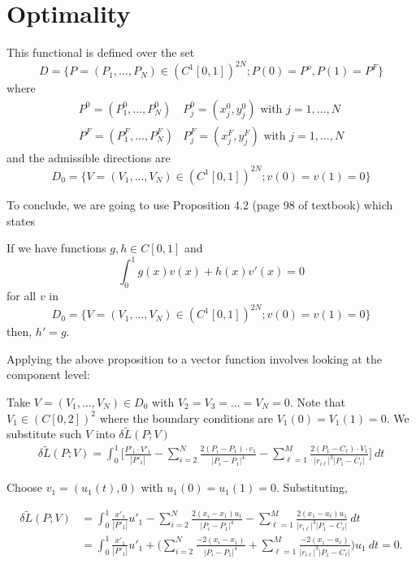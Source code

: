 \section{Optimality}


This functional is defined over the set 
\[ D = \{ P = (P_1,...,P_N) \in (C^1[0,1])^{2N} ; P(0) = P^{o}, P(1) = P^{F} \}\] where 
\begin{align*}
    P^{0} = (P^{0}_1,...,P^{0}_N) &  P_{j}^{0} = (x_{j}^{0}, y_{j}^{0})  \text{ with } j = 1,...,N\\
    P^{F} = (P^{F}_1,...,P^{F}_N) & P_{j}^{F} = (x_{j}^{F}, y_{j}^{F})  \text{ with } j = 1,...,N
\end{align*}
and the admissible directions are
\[ D_0 = \{ V = (V_1,...,V_N) \in (C^1[0,1])^{2N} ; v(0)=v(1)=0  \} \]

To conclude, we are going to use Proposition 4.2 (page 98 of textbook) which states

\begin{prop}
    If we have functions \( g,h \in C[0,1] \) and 
\[ \int_{0}^{1} g(x)v(x) + h(x)v'(x) = 0 \]
for all \( v \) in 
\[ D_0 = \{ V = (V_1,...,V_N) \in (C^1[0,1])^{2N} ; v(0)=v(1)=0  \} \]
then, \( h' = g \). 
\end{prop}

 Applying the above proposition to a vector function involves looking at the component level: 

Take \( V = (V_1,...,V_N) \in D_{0}\) with \( V_2 = V_3 = ... = V_N = 0 \). Note that \( V_1 \in (C[0,2])^2 \) where the boundary conditions are \( V_1(0) = V_1(1) = 0 \). We substitute such \( V\) into \( \delta \tilde{L}(P;V) \) 
\begin{align*}
    \delta \tilde{L}(P;V) = \int_{0}^{1} \bigg[ \frac{P'_1 \cdot V'_1}{|P'_1|} - \sum_{i=2}^{N} \frac{2(P_i - P_1) \cdot v_1}{| P_i - P_1|^4} 
               - \sum_{\ell=1}^{M} \frac{2(P_1 - C_{\ell}) \cdot V_1}{\big| r_{i\ell}\big|^3\big|P_1 - C_{\ell} \big| } \bigg] \ dt
\end{align*}

Choose \( v_1 = (u_1(t), 0) \) with \( u_1(0) = u_1(1) = 0 \). Substituting,

\begin{align*}
    \delta \tilde{L}(P;V) &= \int_{0}^{1} \frac{x'_1}{|P'_1|}u'_1 - \sum_{i=2}^{N} \frac{2(x_i - x_1)u_1}{|P_i - P_1|^4} - \sum_{\ell = 1}^{M} \frac{2(x_1 - a_{\ell})u_1}{|r_{i\ell}|^3|P_1 - C_{\ell}|} \ dt \\
    &= \int_{0}^{1} \frac{x'_1}{|P'_1|}u'_1 + \bigg( \sum_{i=2}^{N} \frac{-2(x_i - x_1)}{|P_i - P_1|^4} + \sum_{\ell = 1}^{M} \frac{-2(x_1 - a_{\ell})}{|r_{i\ell}|^3|P_1 - C_{\ell}|} \bigg)u_1 \ dt = 0.
\end{align*}

